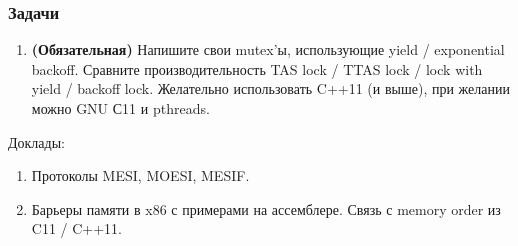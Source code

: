 \documentclass[aspectratio=169, pdf, 8pt, unicode]{beamer}
\begin{document}
\begin{frame}
\frametitle{Задачи}
\begin{enumerate}
\item \textbf{(Обязательная)} Напишите свои mutex'ы, использующие yield / exponential backoff.
    Сравните производительность TAS lock / TTAS lock / lock with yield / backoff lock.
    Желательно использовать C++11 (и выше), при желании можно GNU С11 и pthreads.
\end{enumerate}

Доклады:
\begin{enumerate}
\item Протоколы MESI, MOESI, MESIF.
\item Барьеры памяти в x86 с примерами на ассемблере. Связь с memory order из C11 / C++11.
\end{enumerate}

\end{frame}
\end{document}
